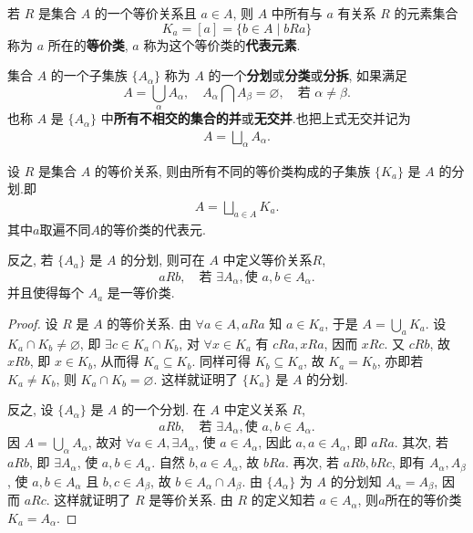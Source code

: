 \documentclass[../../main.tex]{subfiles}%
\begin{document}
\begin{definition}[等价类和代表元素]
若 \( R \) 是集合 \( A \) 的一个等价关系且 \( a \in A \), 则 \( A \) 中所有与 \( a \) 有关系 \( R \) 的元素集合
\[
K_a =[a]= \{ b \in A \mid bRa \}
\]
称为 \( a \) 所在的\textbf{等价类}, \( a \) 称为这个等价类的\textbf{代表元素}.
\end{definition}

\begin{definition}[分划/分类]
集合 \( A \) 的一个子集族 \( \{ A_\alpha \} \) 称为 \( A \) 的一个\textbf{分划}或\textbf{分类}或\textbf{分拆}, 如果满足
\[
A = \bigcup_\alpha A_\alpha,\quad A_\alpha \bigcap A_\beta = \varnothing,\quad \text{若 } \alpha \neq \beta.
\]
也称 \( A \) 是 \( \{ A_\alpha \} \) 中\textbf{所有不相交的集合的并}或\textbf{无交并}.也把上式无交并记为
\begin{align*}
A = \bigsqcup_{\alpha}A_\alpha .
\end{align*}
\end{definition}

\begin{theorem}\label{theorem:等价类就和集合的分划对应-定理1.1.1}
设 \( R \) 是集合 \( A \) 的等价关系, 则由所有不同的等价类构成的子集族 \( \{ K_a \} \) 是 \( A \) 的分划.即
\begin{align*}
A=\bigsqcup_{a\in A}K_a.
\end{align*}
其中$a$取遍不同$A$的等价类的代表元.

反之, 若 \( \{ A_a \} \) 是 \( A \) 的分划, 则可在 \( A \) 中定义等价关系$R$,
\[
aRb, \quad \text{若 } \exists A_\alpha, \text{使 } a,b \in A_\alpha.
\]
并且使得每个 \( A_a \) 是一等价类.
\end{theorem}
\begin{proof}

设 \( R \) 是 \( A \) 的等价关系. 由 \( \forall a \in A, aRa \) 知 \( a \in K_a \), 于是 \( A = \bigcup_a K_a \). 设 \( K_a \cap K_b \neq \varnothing \), 即 \( \exists c \in K_a \cap K_b \), 对 \( \forall x \in K_a \) 有 \( cRa, xRa \), 因而 \( xRc \). 又 \( cRb \), 故 \( xRb \), 即 \( x \in K_b \), 从而得 \( K_a \subseteq K_b \). 同样可得 \( K_b \subseteq K_a \), 故 \( K_a = K_b \), 亦即若 \( K_a \neq K_b \), 则 \( K_a \cap K_b = \varnothing \). 这样就证明了 \( \{ K_a \} \) 是 \( A \) 的分划.

反之, 设 \( \{ A_\alpha \} \) 是 \( A \) 的一个分划. 在 \( A \) 中定义关系 \( R \),
\[
aRb, \quad \text{若 } \exists A_\alpha, \text{使 } a,b \in A_\alpha.
\]
因 \( A = \bigcup_\alpha A_\alpha \), 故对 \( \forall a \in A, \exists A_\alpha \), 使 \( a \in A_\alpha \), 因此 \( a,a \in A_\alpha \), 即 \( aRa \). 其次, 若 \( aRb \), 即 \( \exists A_\alpha \), 使 \( a,b \in A_\alpha \). 自然 \( b,a \in A_\alpha \), 故 \( bRa \). 再次, 若 \( aRb, bRc \), 即有 \( A_\alpha, A_\beta \), 使 \( a,b \in A_\alpha \) 且 \( b,c \in A_\beta \), 故 \( b \in A_\alpha \cap A_\beta \). 由 \( \{ A_\alpha \} \) 为 \( A \) 的分划知 \( A_\alpha = A_\beta \), 因而 \( aRc \). 这样就证明了 \( R \) 是等价关系. 由 \( R \) 的定义知若 \( a \in A_\alpha \), 则$a$所在的等价类\( K_a = A_\alpha \).

\end{proof}
\end{document}
